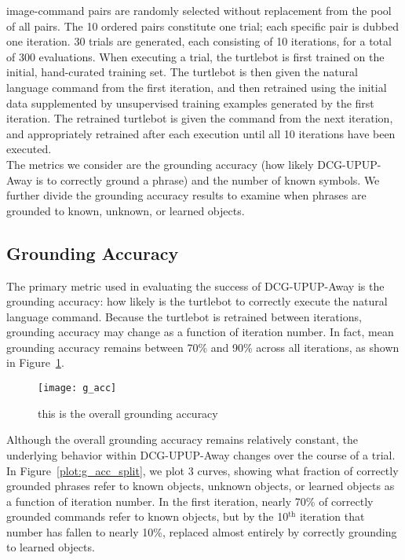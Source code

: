  image-command pairs are randomly selected without replacement from the pool of all pairs.
The 10 ordered pairs constitute one trial; each specific pair is dubbed one iteration.
30 trials are generated, each consisting of 10 iterations, for a total of 300 evaluations.
When executing a trial, the turtlebot is first trained on the initial, hand-curated training set.
The turtlebot is then given the natural language command from the first iteration, and then retrained using the initial data supplemented by unsupervised training examples generated by the first iteration.
The retrained turtlebot is given the command from the next iteration, and appropriately retrained after each execution until all 10 iterations have been executed.\\
\indent The metrics we consider are the grounding accuracy (how likely DCG-UPUP-Away is to correctly ground a phrase) and the number of known symbols.
We further divide the grounding accuracy results to examine when phrases are grounded to known, unknown, or learned objects.
\subsection{Grounding Accuracy}
The primary metric used in evaluating the success of DCG-UPUP-Away is the grounding accuracy: how likely is the turtlebot to correctly execute the natural language command.
Because the turtlebot is retrained between iterations, grounding accuracy may change as a function of iteration number.
In fact, mean grounding accuracy remains between 70\% and 90\% across all iterations, as shown in Figure~\ref{fig:g_acc}.\\
\begin{figure}[h]
\centering
\texttt{[image: g\_acc]}
\caption{this is the overall grounding accuracy}
\label{fig:g_acc}
\end{figure}

\indent Although the overall grounding accuracy remains relatively constant, the underlying behavior within DCG-UPUP-Away changes over the course of a trial.
In Figure~\ref{plot:g_acc_split}, we plot 3 curves, showing what fraction of correctly grounded phrases refer to known objects, unknown objects, or learned objects as a function of iteration number.
In the first iteration, nearly 70\% of correctly grounded commands refer to known objects, but by the 10$^\text{th}$ iteration that number has fallen to nearly 10\%, replaced almost entirely by correctly grounding to learned objects.

